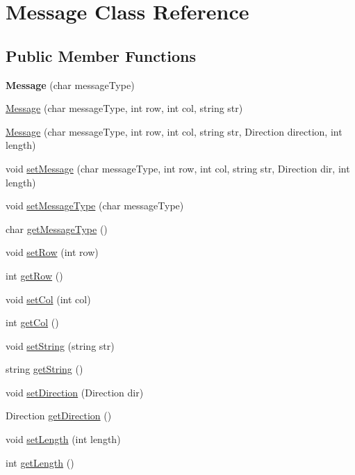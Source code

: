 \hypertarget{classMessage}{}\section{Message Class Reference}
\label{classMessage}
\subsection*{Public Member Functions}
\begin{DoxyCompactItemize}
\item 
{\bfseries Message} (char message\+Type)\hypertarget{classMessage_a686de693caae6801c4166059c27b7d08}{}\label{classMessage_a686de693caae6801c4166059c27b7d08}

\item 
\hyperlink{classMessage_a80ab6afe392ce5e694b447afd9044157}{Message} (char message\+Type, int row, int col, string str)
\item 
\hyperlink{classMessage_ae9e528554719adc2f777127eef25dc2f}{Message} (char message\+Type, int row, int col, string str, Direction direction, int length)
\item 
void \hyperlink{classMessage_a94c72e31b237a6fdf5b7e8322b95968d}{set\+Message} (char message\+Type, int row, int col, string str, Direction dir, int length)
\item 
void \hyperlink{classMessage_a4b4d42daa2c19f73bff2d8f29dc804df}{set\+Message\+Type} (char message\+Type)
\item 
char \hyperlink{classMessage_a884cdb00112d8a9384f6104dc3337e4b}{get\+Message\+Type} ()
\item 
void \hyperlink{classMessage_a7a8c1fc4ff5a7bf0e655fa0687c7df4e}{set\+Row} (int row)
\item 
int \hyperlink{classMessage_aa2708d74b1d58537422a83a37b6a275f}{get\+Row} ()
\item 
void \hyperlink{classMessage_a7717e65a880cb26ad71b42f4329dd454}{set\+Col} (int col)
\item 
int \hyperlink{classMessage_a4fa8083689146e7edf15d657ee50e269}{get\+Col} ()
\item 
void \hyperlink{classMessage_a5aae5916bada80e8479cb8fe74228328}{set\+String} (string str)
\item 
string \hyperlink{classMessage_a7c8749c950d40f3fc0c1f784ddfb74ce}{get\+String} ()
\item 
void \hyperlink{classMessage_afa618cd45633822b6cc6b4442be59575}{set\+Direction} (Direction dir)
\item 
Direction \hyperlink{classMessage_ae5d197bb228eaf467ec5dc388b917f0e}{get\+Direction} ()
\item 
void \hyperlink{classMessage_a3744f027955cc28cc1b47a2ea807fb60}{set\+Length} (int length)
\item 
int \hyperlink{classMessage_a251e53a9658b9f5baa5eac040d81c7ab}{get\+Length} ()
\end{DoxyCompactItemize}


